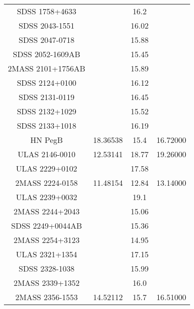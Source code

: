 \begin{table}
\begin{tabular}{cccc}
SDSS 1758+4633 &  & 16.2 &  \\
SDSS 2043-1551 &  & 16.02 &  \\
SDSS 2047-0718 &  & 15.88 &  \\
SDSS 2052-1609AB &  & 15.45 &  \\
2MASS 2101+1756AB &  & 15.89 &  \\
SDSS 2124+0100 &  & 16.12 &  \\
SDSS 2131-0119 &  & 16.45 &  \\
SDSS 2132+1029 &  & 15.52 &  \\
SDSS 2133+1018 &  & 16.19 &  \\
HN PegB & 18.36538 & 15.4 & 16.72000 \\
ULAS 2146-0010 & 12.53141 & 18.77 & 19.26000 \\
ULAS 2229+0102 &  & 17.58 &  \\
2MASS 2224-0158 & 11.48154 & 12.84 & 13.14000 \\
ULAS 2239+0032 &  & 19.1 &  \\
2MASS 2244+2043 &  & 15.06 &  \\
SDSS 2249+0044AB &  & 15.36 &  \\
2MASS 2254+3123 &  & 14.95 &  \\
ULAS 2321+1354 &  & 17.15 &  \\
SDSS 2328-1038 &  & 15.99 &  \\
2MASS 2339+1352 &  & 16.0 &  \\
2MASS 2356-1553 & 14.52112 & 15.7 & 16.51000 \\
\end{tabular}
\end{table}
